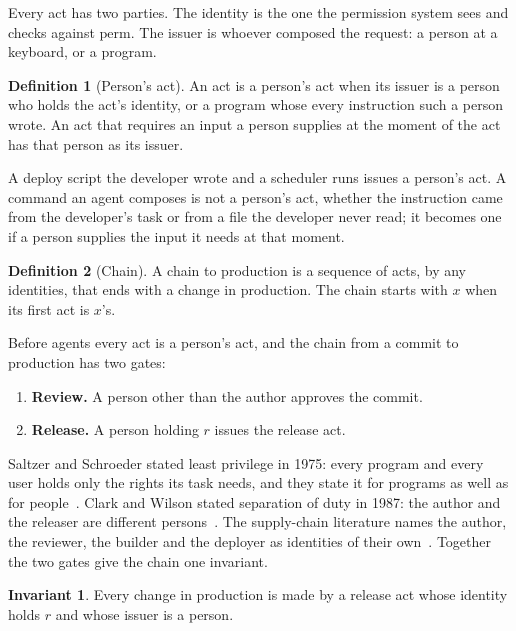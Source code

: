 \documentclass[11pt]{article}
\theoremstyle{definition}
\newtheorem{definition}{Definition}
\newtheorem{invariant}{Invariant}
\begin{document}
Every act has two parties. The identity is the one the permission system sees and checks against $\mathrm{perm}$. The issuer is whoever composed the request: a person at a keyboard, or a program.

\begin{definition}[Person's act]
\label{def:person}
An act is a person's act when its issuer is a person who holds the act's identity, or a program whose every instruction such a person wrote. An act that requires an input a person supplies at the moment of the act has that person as its issuer.
\end{definition}

A deploy script the developer wrote and a scheduler runs issues a person's act. A command an agent composes is not a person's act, whether the instruction came from the developer's task or from a file the developer never read; it becomes one if a person supplies the input it needs at that moment.

\begin{definition}[Chain]
\label{def:chain}
A chain to production is a sequence of acts, by any identities, that ends with a change in production. The chain starts with $x$ when its first act is $x$'s.
\end{definition}

Before agents every act is a person's act, and the chain from a commit to production has two gates:

\begin{enumerate}
\item \textbf{Review.} A person other than the author approves the commit.
\item \textbf{Release.} A person holding $r$ issues the release act.
\end{enumerate}

Saltzer and Schroeder stated least privilege in 1975: every program and every user holds only the rights its task needs, and they state it for programs as well as for people~\cite{Saltzer}. Clark and Wilson stated separation of duty in 1987: the author and the releaser are different persons~\cite{ClarkWilson}. The supply-chain literature names the author, the reviewer, the builder and the deployer as identities of their own~\cite{Okafor,SLSA,BAB}. Together the two gates give the chain one invariant.

\begin{invariant}
\label{inv:main}
Every change in production is made by a release act whose identity holds $r$ and whose issuer is a person.
\end{invariant}
\end{document}
